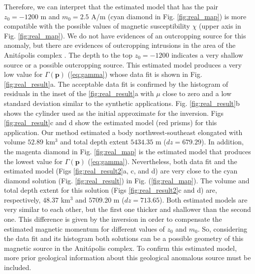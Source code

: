 Therefore, we can interpret that the estimated model that has the pair $z_0 = -1200$ m and $m_0 = 2.5$ A/m (cyan diamond in Fig. \ref{fig:real_map}) is more compatible with the possible values of magnetic susceptibility $ \chi $ (upper axis in Fig. \ref{fig:real_map}). We do not have evidences of an outcropping source for this anomaly, but there are evidences of outcropping intrusions in the area of the Anitápolis complex \cite[]{gibson-1999}. The depth to the top $z_0 = -1200$ indicates a very shallow source or a possible outcropping source. This estimated model produces a very low value for $ \Gamma(\mathbf{p}) $ (\ref{eq:gamma}) whose data fit is shown in Fig. \ref{fig:real_result}a. The acceptable data fit is confirmed by the histogram of residuals in the inset of the \ref{fig:real_result}a with $ \mu $ close to zero and a low standard deviation similar to the synthetic applications. Fig. \ref{fig:real_result}b shows the cylinder used as the initial approximate for the inversion. Figs \ref{fig:real_result}c and d show the estimated model (red prisms) for this application. Our method estimated a body northwest-southeast elongated with volume $ 52.89 $ km$ ^3 $ and total depth extent $ 5434.35 $ m ($ dz=679.29 $). In addition, the magenta diamond in Fig. \ref{fig:real_map} is the estimated model that produces the lowest value for $ \Gamma(\mathbf{p}) $ (\ref{eq:gamma}). Nevertheless, both data fit and the estimated model (Figs \ref{fig:real_result2}a, c, and d) are very close to the cyan diamond solution (Fig. \ref{fig:real_result}) in Fig. (\ref{fig:real_map}). The volume and total depth extent for this solution (Figs \ref{fig:real_result2}c and d) are, respectively, $ 48.37 $ km$ ^3 $ and $ 5709.20 $ m ($ dz=713.65 $). Both estimated models are very similar to each other, but the first one thicker and shallower than the second one. This difference is given by the inversion in order to compensate the estimated magnetic momentum for different values of $ z_0 $ and $ m_0 $. So, considering the data fit and its histogram both solutions can be a possible geometry of this magnetic source in the Anitápolis complex. To confirm this estimated model, more prior geological information about this geological anomalous source must be included.